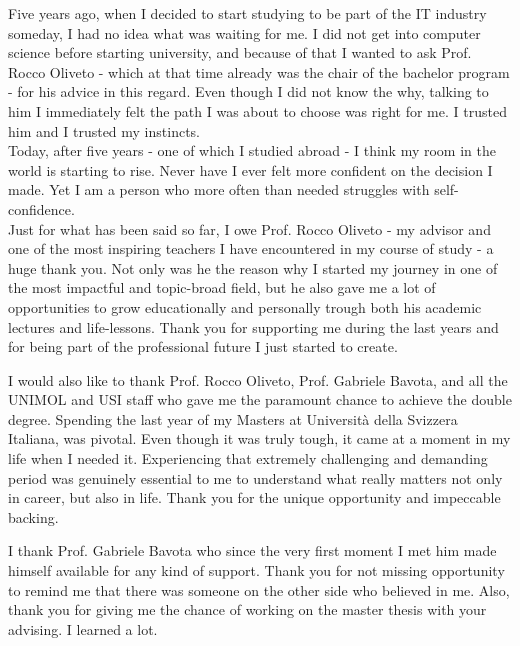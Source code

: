 \begin{acknowledgements}

\addchaptertocentry{\acknowledgementname}
Five years ago, when I decided to start studying to be part of the IT industry someday, 
I had no idea what was waiting for me. 
I did not get into computer science before starting university, and because of that 
I wanted to ask Prof. Rocco Oliveto - which at that time already was the chair of the bachelor program - for his advice 
in this regard. Even though I did not know the why, talking to him I immediately felt the path I was about to choose was right for me. 
I trusted him and I trusted my instincts. \\
Today, after five years - one of which I studied abroad - I think my room in the world is starting to rise.
Never have I ever felt more confident on the decision I made. Yet I am a person who more often than needed struggles with self-confidence.\\
\newline
Just for what has been said so far, I owe Prof. Rocco Oliveto - my advisor and one of the most inspiring teachers I have encountered
in my course of study - a huge thank you. Not only was he the reason why I started my journey in one of the most impactful and topic-broad field, 
but he also gave me a lot of opportunities to grow educationally and personally trough both his academic lectures and life-lessons.
Thank you for supporting me during the last years and for being part of the professional future I just started to create.

I would also like to thank Prof. Rocco Oliveto, Prof. Gabriele Bavota, and all the UNIMOL and USI staff who gave me the paramount chance to 
achieve the double degree. 
Spending the last year of my Masters at Università della Svizzera Italiana, was pivotal. Even though it was
truly tough, it came at a moment in my life when I needed it. 
Experiencing that extremely challenging and demanding 
period was genuinely essential to me to understand what really matters not only in career, but also in life. Thank you 
for the unique opportunity and impeccable backing.

I thank Prof. Gabriele Bavota who since the very first moment I met him made himself available for any kind of support. 
Thank you for not missing opportunity to remind me that there was someone on the other side who believed in me. Also, thank you 
for giving me the chance of working on the master thesis with your advising. I learned a lot.


\end{acknowledgements}
